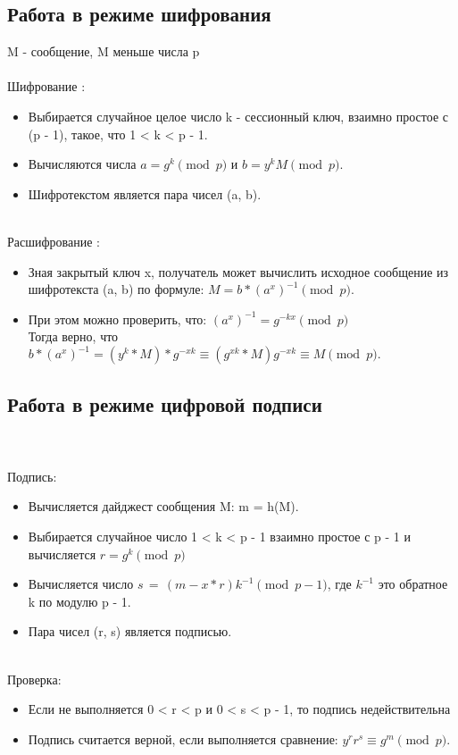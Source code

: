 \documentclass[a4paper]{article}
\begin{document}
\subsection*{Работа в режиме шифрования}
M - сообщение, M меньше числа p \\
\\
\caption{Шифрование :}
\begin{itemize}
    \item Выбирается случайное целое число k - сессионный ключ, взаимно простое с (p - 1), такое, что 1 < k < p - 1.
    \item Вычисляются числа ${a = g^{k}{\pmod {p}}}$ и ${b = y^{k}M{\pmod {p}}}$.
    \item Шифротекстом является пара чисел (a, b).
\end{itemize}
\\
\caption{Расшифрование :}
\begin{itemize}
    \item Зная закрытый ключ x, получатель может вычислить исходное сообщение из шифротекста (a, b) по формуле:
            ${M = b * (a^{x})^{-1}{\pmod {p}}.}$\\
    \item При этом можно проверить, что: ${(a^{x})^{-1} = g^{-kx}{\pmod {p}}}$\\
    Тогда верно, что \\
    ${b * (a^{x})^{-1} = (y^{k} * M) * g^{-xk}\equiv (g^{xk} * M)g^{-xk}\equiv M{\pmod {p}}}.$
\end{itemize}

\subsection*{Работа в режиме цифровой подписи}
 \\
\\
\caption{Подпись:}
\begin{itemize}
    \item Вычисляется дайджест сообщения M: m = h(M).
    \item Выбирается случайное число {1 < k < p - 1} взаимно простое с p - 1 и вычисляется ${r=g^{k}{\pmod {p}}}$
    \item Вычисляется число ${s\,=\,(m - x * r)k^{-1}{\pmod {p - 1}}}$, где ${k^{-1}}$ это обратное k по модулю p - 1.
    \item Пара чисел (r, s) является подписью.
\end{itemize}
\\
\caption{Проверка:}
\begin{itemize}
    \item Если не выполняется 0 < r < p и 0 < s < p - 1, то подпись недействительна
    \item Подпись считается верной, если выполняется сравнение: ${y^{r}r^{s} \equiv g^{m}{\pmod {p}}.}$
\end{itemize}
\end{document}
